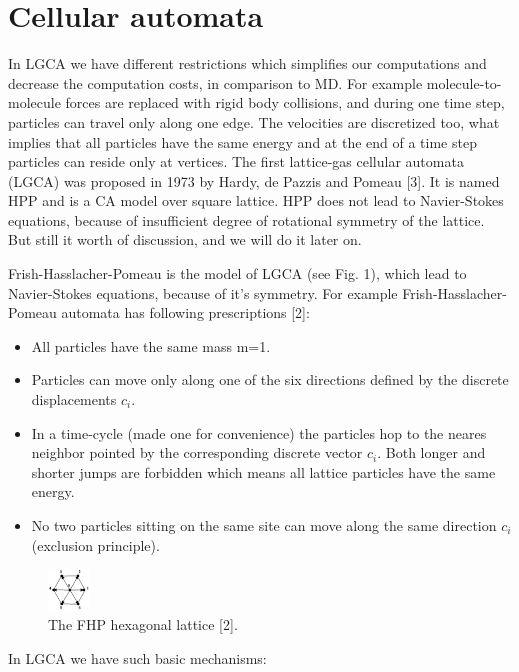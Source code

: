 
\section{Cellular automata}
In LGCA we have different restrictions which simplifies our computations and decrease the computation costs, in comparison to MD. For example molecule-to-molecule forces are replaced with rigid body collisions, and during one time step, particles can travel only along one edge.  The velocities are discretized too, what implies that all particles have the same energy and at the end of a time step particles can reside only at vertices.
The first lattice-gas cellular automata (LGCA) was proposed in 1973 by Hardy, de Pazzis and Pomeau [3]. It is named HPP and is a CA model over square lattice. HPP does not lead to Navier-Stokes equations, because of insufficient degree of rotational symmetry of the lattice. But still it worth of discussion, and we will do it later on.

Frish-Hasslacher-Pomeau is the model of LGCA (see Fig. 1), which lead to Navier-Stokes equations, because of it's symmetry. For example Frish-Hasslacher-Pomeau automata has following prescriptions [2]:

\begin{itemize}
\item All particles have the same mass m=1.
\item Particles can move only along one of the six directions defined by the discrete displacements $c_{i}$.
\item In a time-cycle (made one for convenience) the particles hop to the neares neighbor pointed by the corresponding discrete vector $c_{i}$. Both longer and shorter jumps are forbidden which means all lattice particles have the same energy.
\item No two particles sitting on the same site can move along the same direction $c_{i}$ (exclusion principle).
\end{itemize}

\begin{figure}[H]
  \centering
  \includegraphics[width=0.1\textwidth]{img/fig1.png}
  \caption{The FHP hexagonal lattice [2].}
\end{figure}

In LGCA we have such basic mechanisms:


